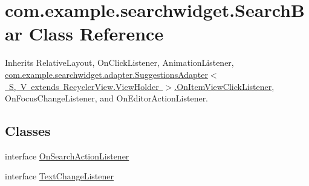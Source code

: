 \hypertarget{classcom_1_1example_1_1searchwidget_1_1_search_bar}{}\section{com.\+example.\+searchwidget.\+Search\+Bar Class Reference}
\label{classcom_1_1example_1_1searchwidget_1_1_search_bar}


Inherits Relative\+Layout, On\+Click\+Listener, Animation\+Listener, \mbox{\hyperlink{interfacecom_1_1example_1_1searchwidget_1_1adapter_1_1_suggestions_adapter_1_1_on_item_view_click_listener}{com.\+example.\+searchwidget.\+adapter.\+Suggestions\+Adapter$<$ S, V extends Recycler\+View.\+View\+Holder $>$.\+On\+Item\+View\+Click\+Listener}}, On\+Focus\+Change\+Listener, and On\+Editor\+Action\+Listener.

\subsection*{Classes}
\begin{DoxyCompactItemize}
\item 
interface \mbox{\hyperlink{interfacecom_1_1example_1_1searchwidget_1_1_search_bar_1_1_on_search_action_listener}{On\+Search\+Action\+Listener}}
\item 
interface \mbox{\hyperlink{interfacecom_1_1example_1_1searchwidget_1_1_search_bar_1_1_text_change_listener}{Text\+Change\+Listener}}
\end{DoxyCompactItemize}
